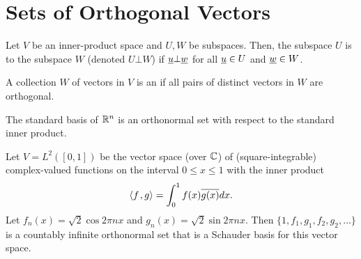\section{Sets of Orthogonal Vectors}

\begin{definition}
Let $V$ be an inner-product space and $U,W$ be subspaces.
Then, the subspace $U$ is  to the subspace $W$ (denoted $U \bot W$) if $\underline{u} \bot \underline{w}$ for all $\underline{u}\in U$ and $\underline{w}\in W$.
\end{definition}

\begin{definition}
A collection $W$ of vectors in $V$ is an  if all pairs of distinct vectors in $W$ are orthogonal.
\end{definition}

\begin{example}
The standard basis of $\mathbb{R}^n$ is an orthonormal set with respect to the standard inner product.
\end{example}

\begin{example}
Let $V=L^2 ([0,1])$ be the vector space (over $\mathbb{C}$) of (square-integrable) complex-valued functions on the interval $0 \leq x \leq 1$ with the inner product
\begin{equation*}
{\left\langle  f  \mskip2mu ,  g  \right\rangle} = \int_0^1 f(x) \overline{g(x)} dx.
\end{equation*}
Let $f_n(x) = \sqrt{2} \cos 2 \pi n x$ and $g_n (x) = \sqrt{2} \sin 2 \pi n x$.
Then $\{ 1, f_1, g_1, f_2, g_2, \ldots \}$ is a countably infinite orthonormal set that is a Schauder basis for this vector space.
\end{example}

